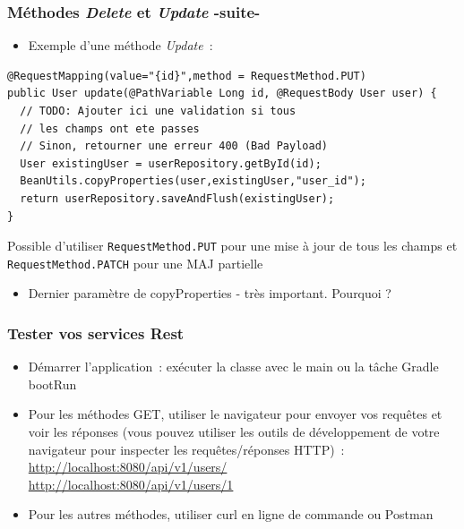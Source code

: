 \documentclass{beamer}
\begin{document}
\begin{frame}[fragile]
\frametitle{Méthodes \textit{Delete} et \textit{Update} -suite-}
\begin{itemize}	
	\item Exemple d'une méthode \textit{Update}~:
\end{itemize}
\begin{lstlisting}
@RequestMapping(value="{id}",method = RequestMethod.PUT)
public User update(@PathVariable Long id, @RequestBody User user) {
  // TODO: Ajouter ici une validation si tous 
  // les champs ont ete passes
  // Sinon, retourner une erreur 400 (Bad Payload)
  User existingUser = userRepository.getById(id);
  BeanUtils.copyProperties(user,existingUser,"user_id");
  return userRepository.saveAndFlush(existingUser);
}
\end{lstlisting}
Possible d'utiliser \texttt{RequestMethod.PUT} pour une mise à jour de tous les champs et \texttt{RequestMethod.PATCH} pour une MAJ partielle
\begin{itemize}	
\item Dernier paramètre de copyProperties - très important. Pourquoi ?
\end{itemize}
\end{frame}

\begin{frame}[fragile]
	\frametitle{Tester vos services Rest}
	\begin{itemize}
		\item Démarrer l'application~: exécuter la classe avec le main ou la tâche Gradle bootRun
		\item Pour les méthodes GET, utiliser le navigateur pour envoyer vos requêtes et voir les réponses (vous pouvez utiliser les outils de développement de votre navigateur pour inspecter les requêtes/réponses HTTP)~:
		\url{http://localhost:8080/api/v1/users/}\\
		\url{http://localhost:8080/api/v1/users/1}
		\item Pour les autres méthodes, utiliser curl en ligne de commande ou Postman
\end{itemize}
\end{frame}
\end{document}

